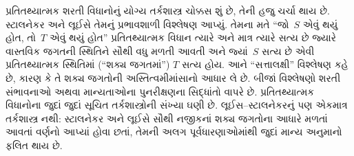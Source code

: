 \documentclass[../../../include/open-logic-section]{subfiles}
\begin{document}
પ્રતિતથ્યાત્મક શરતી વિધાનોનું યોગ્ય તર્કશાસ્ત્ર ચોક્કસ શું છે, તેની
હજુ ચર્ચા થાય છે. સ્ટાલનેકર અને લૂઈસે તેમનું પ્રભાવશાળી વિશ્લેષણ
આપ્યું. તેમના મતે ``જો~$S$ એવું થયું હોત, તો~$T$ એવું થયું હોત''
પ્રતિતથ્યાત્મક વિધાન ત્યારે અને માત્ર ત્યારે સત્ય છે જ્યારે વાસ્તવિક
જગતની સ્થિતિને સૌથી વધુ મળતી આવતી અને જ્યાં~$S$ સત્ય છે એવી
પ્રતિતથ્યાત્મક સ્થિતિમાં (``શક્ય જગતમાં'') $T$ સત્ય હોય. આને
``સત્તાલક્ષી'' વિશ્લેષણ કહે છે, કારણ કે તે શક્ય જગતોની
અસ્તિત્વમીમાંસાનો આધાર લે છે. બીજાં વિશ્લેષણો શરતી સંભાવનાઓ અથવા
માન્યતાઓના પુનરીક્ષણના સિદ્ધાંતો વાપરે છે. પ્રતિતથ્યાત્મક વિધાનોના
જુદાં જુદાં સૂચિત તર્કશાસ્ત્રોની સંખ્યા ઘણી છે. લૂઈસ--સ્ટાલનેકરનું
પણ એકમાત્ર તર્કશાસ્ત્ર નથી: સ્ટાલનેકર અને લૂઈસે સૌથી નજીકનાં શક્ય
જગતોના આધારે મળતાં આવતાં વર્ણનો આપ્યાં હોવા છતાં, તેમની અલગ
પૂર્વધારણાઓમાંથી જુદાં માન્ય અનુમાનો ફલિત થાય છે.
\end{document}
